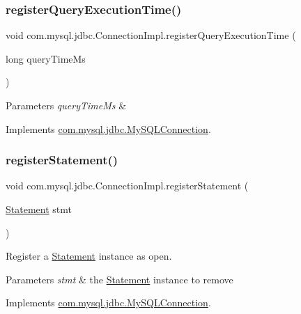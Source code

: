\subsubsection{\texorpdfstring{register\+Query\+Execution\+Time()}{registerQueryExecutionTime()}}
{\footnotesize\ttfamily void com.\+mysql.\+jdbc.\+Connection\+Impl.\+register\+Query\+Execution\+Time (\begin{DoxyParamCaption}\item[{long}]{query\+Time\+Ms }\end{DoxyParamCaption})}


\begin{DoxyParams}{Parameters}
{\em query\+Time\+Ms} & \\
\hline
\end{DoxyParams}


Implements \mbox{\hyperlink{interfacecom_1_1mysql_1_1jdbc_1_1_my_s_q_l_connection}{com.\+mysql.\+jdbc.\+My\+S\+Q\+L\+Connection}}.

\mbox{\label{classcom_1_1mysql_1_1jdbc_1_1_connection_impl_a54dd983d4854293d33c87b562e220a9c}} 
\subsubsection{\texorpdfstring{register\+Statement()}{registerStatement()}}
{\footnotesize\ttfamily void com.\+mysql.\+jdbc.\+Connection\+Impl.\+register\+Statement (\begin{DoxyParamCaption}\item[{\mbox{\hyperlink{interfacecom_1_1mysql_1_1jdbc_1_1_statement}{Statement}}}]{stmt }\end{DoxyParamCaption})}

Register a \mbox{\hyperlink{interfacecom_1_1mysql_1_1jdbc_1_1_statement}{Statement}} instance as open.


\begin{DoxyParams}{Parameters}
{\em stmt} & the \mbox{\hyperlink{interfacecom_1_1mysql_1_1jdbc_1_1_statement}{Statement}} instance to remove \\
\hline
\end{DoxyParams}


Implements \mbox{\hyperlink{interfacecom_1_1mysql_1_1jdbc_1_1_my_s_q_l_connection}{com.\+mysql.\+jdbc.\+My\+S\+Q\+L\+Connection}}.

